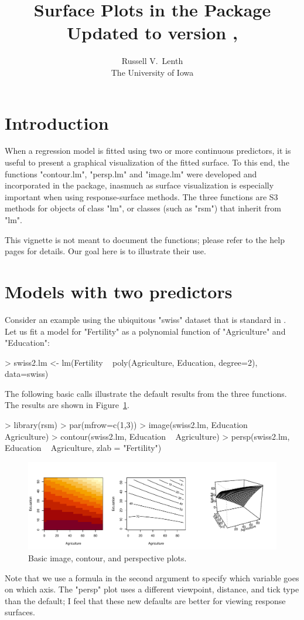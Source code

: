 \documentclass[article,nojss]{jss}
\author{Russell V.~Lenth\\The University of Iowa}
\title{Surface Plots in the \pkg{rsm} Package\\
\normalsize Updated to version \VERSION, \DATE}
\def\rsm{\pkg{rsm}}
\def\R{\proglang{R}}
\begin{document}
\section{Introduction}
When a regression model is fitted using two or more continuous predictors, it is useful to present a graphical visualization of the fitted surface.  
To this end, the functions "contour.lm", "persp.lm" and "image.lm" were developed and incorporated in the \rsm{} package, inasmuch as surface visualization is especially important when using response-surface methods.  The three functions are S3 methods for objects of class "lm", or classes (such as "rsm") that inherit from "lm".

This vignette is not meant to document the functions; please refer to the help pages for details.  Our goal here is to illustrate their use.

\section{Models with two predictors}
Consider an example using the ubiquitous "swiss" dataset that is standard in \R{}.  Let us fit a model for "Fertility" as a polynomial function of "Agriculture" and "Education":
\begin{Schunk}
\begin{Sinput}
> swiss2.lm <- lm(Fertility ~ poly(Agriculture, Education, degree=2), data=swiss)
\end{Sinput}
\end{Schunk}
The following basic calls illustrate the default results from the three functions.  The results are shown in Figure~\ref{basics}.
\begin{Schunk}
\begin{Sinput}
> library(rsm)
> par(mfrow=c(1,3))
> image(swiss2.lm, Education ~ Agriculture)
> contour(swiss2.lm, Education ~ Agriculture)
> persp(swiss2.lm, Education ~ Agriculture, zlab = "Fertility")
\end{Sinput}
\end{Schunk}
\begin{figure}
\includegraphics[width=\linewidth, viewport=0 0 583 183, clip]{rsm-plots-basics.pdf}
\caption{Basic image, contour, and perspective plots.}\label{basics}
\end{figure}
Note that we use a formula in the second argument to specify which variable goes on which axis.  The "persp" plot uses a different viewpoint, distance, and tick type than the default; I feel that these new defaults are better for viewing response surfaces.
\end{document}
